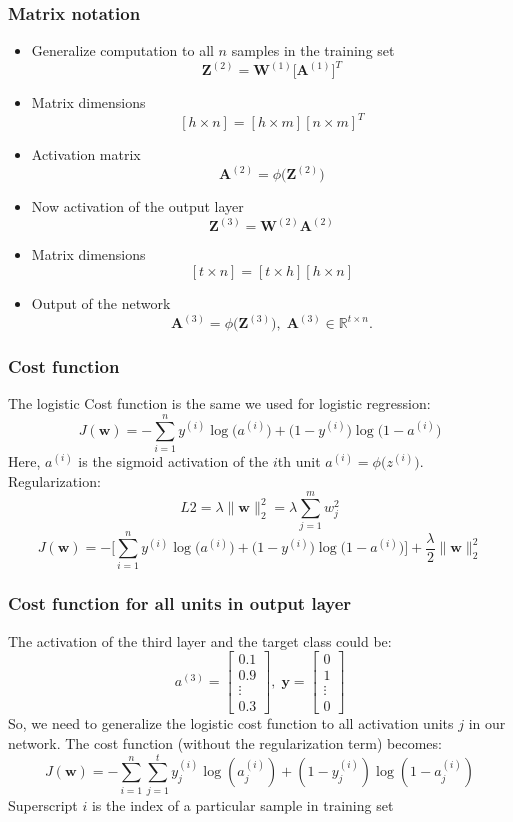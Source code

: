 \documentclass{beamer}
\begin{document}
\begin{frame}
  \frametitle{Matrix notation}
  \begin{itemize}
  \item Generalize computation to all $n$ samples in the training set
    \[
    \mathbf{Z}^{(2)} = \mathbf{W}^{(1)} \big[ \mathbf{A}^{(1)} \big]^T
    \]
  \item Matrix dimensions 
    \[
    [h \times n] = [h \times m] [n \times m]^T
    \]
  \item Activation matrix
    \[
    \mathbf{A}^{(2)} = \phi \big( \mathbf{Z}^{(2)}  \big)
    \]
    \item Now activation of the output layer
      \[
      \mathbf{Z}^{(3)} = \mathbf{W}^{(2)}  \mathbf{A}^{(2)} 
      \]
    \item Matrix dimensions
      \[
      [t \times n] = [t \times h] [h \times n]
      \]
    \item Output of the network
      \[
      \mathbf{A}^{(3)} = \phi \big( \mathbf{Z}^{(3)} \big), \; \mathbf{A}^{(3)} \in \mathbb{R}^{t \times n}.
      \]
  \end{itemize}
\end{frame}

\begin{frame}
  \frametitle{Cost function}
  The logistic Cost function is the same we used for logistic regression:
  \[
  J(\mathbf{w}) = -\sum_{i=1}^{n} y^{(i)} \log \big( a^{(i)} \big) + \big( 1 - y^{(i)} \big) \log \big( 1 - a^{(i)}\big)
  \]
  Here, $a^{(i)}$ is the sigmoid activation of the $i$th unit $a^{(i)} = \phi \big( z^{(i)} \big)$.
  Regularization:
  \[
  L2 = \lambda \lVert  \mathbf{w} \rVert^{2}_{2} = \lambda \sum_{j=1}^{m} w_{j}^{2}
  \]
  \[
  J(\mathbf{w}) = - \Bigg[ \sum_{i=1}^{n} y^{(i)} \log \big( a^{(i)} \big) + \big(1 - y^{(i)} \big) \log \big(1- a^{(i)} \big) \Bigg] + \frac{\lambda}{2} \lVert  \mathbf{w} \rVert^{2}_{2}
  \]

\end{frame}

\begin{frame}
  \frametitle{Cost function for all units in output layer}
  The activation of the third layer and the target class could be:
  \[
  a^{(3)} = 
  \begin{bmatrix}
    0.1 \\
    0.9 \\
    \vdots \\
    0.3
  \end{bmatrix}
  ,\; \mathbf{y} = 
  \begin{bmatrix}
    0 \\
    1 \\
    \vdots \\
    0
  \end{bmatrix}
  \]
  So, we need to generalize the logistic cost function to all activation units $j$ in our network. The cost function (without the regularization term) becomes:
  \[
  J(\mathbf{w}) = - \sum_{i=1}^{n} \sum_{j=1}^{t} y_{j}^{(i)} \log(a_{j}^{(i)}) + (1 - y_{j}^{(i)}) \log(1 - a^{(i)}_{j})
  \]
  Superscript $i$ is the index of a particular sample in training set
\end{frame}
\end{document}
